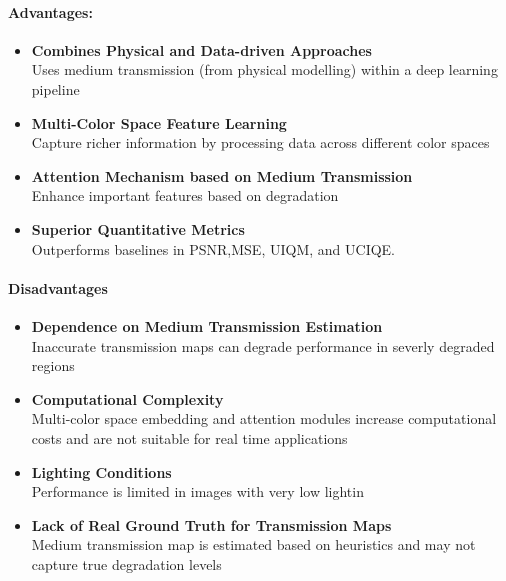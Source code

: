 \paragraph{Advantages:}
\begin{itemize}
    \item \textbf{Combines Physical and Data-driven Approaches} \\
          Uses medium transmission (from physical modelling) within a deep learning pipeline

    \item \textbf{Multi-Color Space Feature Learning} \\
          Capture richer information by processing data across different color spaces
    
    \item \textbf{Attention Mechanism based on Medium Transmission} \\
          Enhance important features based on degradation

    \item \textbf{Superior Quantitative Metrics} \\
          Outperforms baselines in PSNR,MSE, UIQM, and UCIQE.
\end{itemize}

\paragraph{Disadvantages}

\begin{itemize}
    \item \textbf{Dependence on Medium Transmission Estimation} \\
          Inaccurate transmission maps can degrade performance in severly degraded regions

    \item \textbf{Computational Complexity} \\
          Multi-color space embedding and attention modules increase computational costs and are not suitable for real time applications

    \item \textbf{Lighting Conditions} \\
          Performance is limited in images with very low lightin

    \item \textbf{Lack of Real Ground Truth for Transmission Maps} \\
          Medium transmission map is estimated based on heuristics and may not capture true degradation levels
\end{itemize}